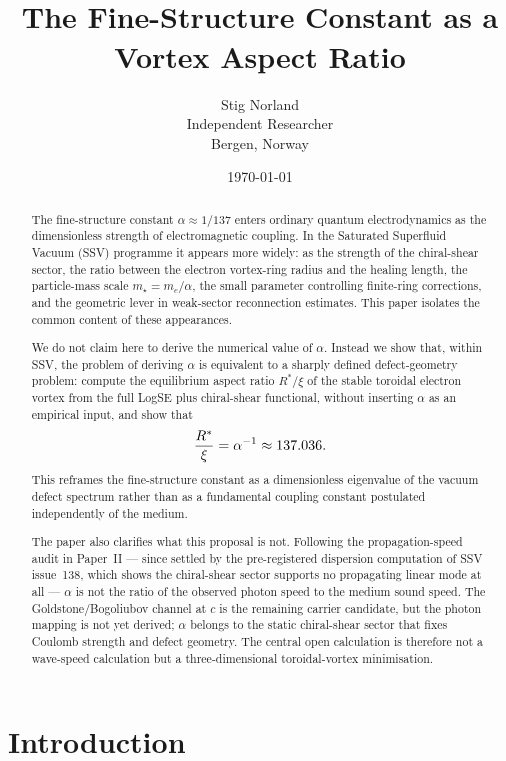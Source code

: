 \documentclass[11pt,a4paper]{article}
\title{\textbf{\seriesname~\papernumber}\\[0.4em]
The Fine-Structure Constant as a Vortex Aspect Ratio}
\author{Stig Norland \\ Independent Researcher \\ Bergen, Norway}
\date{\today}
\begin{document}
\maketitle

\begin{abstract}
The fine-structure constant $\alpha \approx 1/137$ enters ordinary
quantum electrodynamics as the dimensionless strength of electromagnetic
coupling.  In the Saturated Superfluid Vacuum (SSV) programme it appears
more widely: as the strength of the chiral-shear sector, the ratio between
the electron vortex-ring radius and the healing length, the particle-mass
scale $m_\star=m_e/\alpha$, the small parameter controlling
finite-ring corrections, and the geometric lever in weak-sector
reconnection estimates.  This paper isolates the common content of these
appearances.

We do not claim here to derive the numerical value of $\alpha$.  Instead
we show that, within SSV, the problem of deriving $\alpha$ is equivalent to
a sharply defined defect-geometry problem: compute the equilibrium aspect
ratio $R^*/\xi$ of the stable toroidal electron vortex from the full
LogSE plus chiral-shear functional, without inserting $\alpha$ as an
empirical input, and show that
\[
        \frac{R^*}{\xi} = \alpha^{-1} \approx 137.036 .
\]
This reframes the fine-structure constant as a dimensionless eigenvalue of
the vacuum defect spectrum rather than as a fundamental coupling constant
postulated independently of the medium.

The paper also clarifies what this proposal is not.  Following the
propagation-speed audit in Paper~II --- since settled by the
pre-registered dispersion computation of SSV issue~138, which shows the
chiral-shear sector supports no propagating linear mode at all ---
$\alpha$ is not the ratio of the observed photon speed to the medium
sound speed.  The Goldstone/Bogoliubov channel at $c$ is the remaining
carrier candidate, but the photon mapping is not yet derived; $\alpha$
belongs to the static
chiral-shear sector that fixes Coulomb strength and defect geometry.  The
central open calculation is therefore not a wave-speed calculation but a
three-dimensional toroidal-vortex minimisation.
\end{abstract}

\newpage
\tableofcontents
\newpage

\section{Introduction}
\label{sec:introduction}
\end{document}
